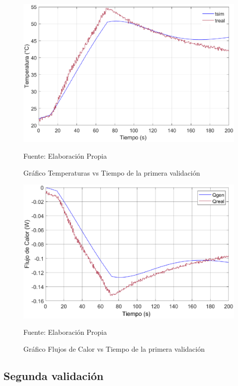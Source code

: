 \begin{figure}[H]
\centering
\includegraphics[scale=0.66]{Figuras/Validacion_1_T.eps}
\caption{Gráfico Temperaturas vs Tiempo de la primera validación}
Fuente: Elaboración Propia
\label{validacion_1_T}
\end{figure}

\begin{figure}[H]
\centering
\includegraphics[scale=0.68]{Figuras/Validacion_1_Q.eps}
\caption{Gráfico Flujos de Calor vs Tiempo de la primera validación}
Fuente: Elaboración Propia
\label{validacion_1_Q}
\end{figure}

\subsection{Segunda validación}

